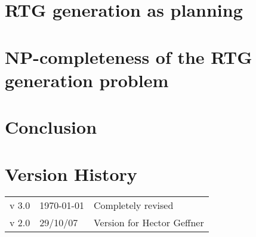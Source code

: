 \documentclass[11pt,a4]{article}
\theoremstyle{plain}
\theoremstyle{definition}
\begin{document}
\section{RTG generation as planning}


\section{NP-completeness of the RTG generation problem}

\section{Conclusion}




\section*{Version History}

\begin{tabular}{lll}
  v 3.0 & \today & Completely revised \\
  v 2.0 & 29/10/07 & Version for Hector Geffner
\end{tabular}





\end{document}
